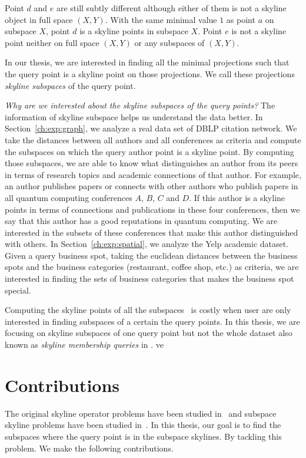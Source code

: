 Point $d$ and $e$ are still subtly different although either of them is not a skyline object in full space $(X, Y)$. With the same minimal value $1$ as point $a$ on subspace $X$, point $d$ is a skyline points in subspace $X$. Point $e$ is not a skyline point neither on full space $(X, Y)$ or any subspaces of $(X, Y)$.

In our thesis, we are interested in finding all the minimal projections such that the query point is a skyline point on those projections. We call these projections \emph{skyline subspaces} of the query point.

\emph{Why are we interested about the skyline subspaces of the query points?} The information of skyline subspace helps us understand the data better. In Section~\ref{ch:exp:graph}, we analyze a real data set of DBLP citation network. We take the distances between all authors and all conferences as criteria and compute the subspaces on which the query author point is a skyline point. By computing those subspaces, we are able to know what distinguishes an author from its peers in terms of research topics and academic connections of that author. For example, an author publishes papers or connects with other authors who publish papers in all quantum computing conferences $A$, $B$, $C$ and $D$. If this author is a skyline points in terms of connections and publications in these four conferences, then we say that this author has a good reputations in quantum computing. We are interested in the subsets of these conferences that make this author distinguished with others. In Section~\ref{ch:exp:spatial}, we analyze the Yelp academic dataset. Given a query business spot, taking the euclidean distances between the business spots and the business categories (restaurant, coffee shop, etc.) as criteria, we are interested in finding the sets of business categories that makes the business spot special.

Computing the skyline points of all the subspaces~\cite{pei2005catching, yuan2005efficient} is costly when user are only interested in finding subspaces of a certain the query points. In this thesis, we are focusing on skyline subspaces of one query point but not the whole dataset also known as \emph{skyline membership queries} in \cite{pei2005catching}.
ve
\section{Contributions}
The original skyline operator problems have been studied in~\cite{borzsony2001skyline, chomicki2003skyline} and subspace skyline problems have been studied in~\cite{pei2005catching, yuan2005efficient}. In this thesis, our goal is to find the subspaces where the query point is in the subspace skylines. By tackling this problem. We make the following contributions.

